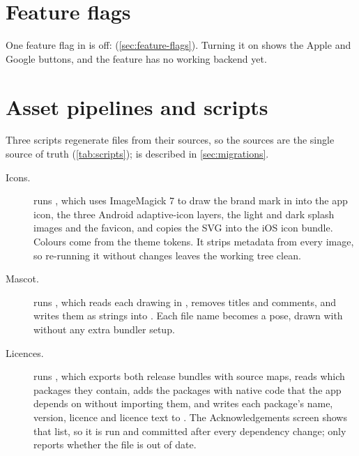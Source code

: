 \section{Feature flags}

One feature flag in  is off:  (\cref{sec:feature-flags}).
Turning it on shows the Apple and Google buttons, and the feature has no working backend yet.

\section{Asset pipelines and scripts}

Three scripts regenerate files from their sources, so the sources are the single source of truth
(\cref{tab:scripts});  is described in \cref{sec:migrations}.

\begin{description}
  \item[Icons.]  runs , which uses ImageMagick 7 to draw
    the brand mark in  into the app icon, the three Android adaptive-icon
    layers, the light and dark splash images and the favicon, and copies the SVG into the iOS icon bundle.
    Colours come from the theme tokens. It strips metadata from every image, so re-running it without
    changes leaves the working tree clean.
  \item[Mascot.]  runs , which reads each drawing in
    , removes titles and comments, and writes them as strings into
    . Each file name becomes a pose, drawn with
     without any extra bundler setup.
  \item[Licences.]  runs , which exports both release
    bundles with source maps, reads which packages they contain, adds the packages with native code that the
    app depends on without importing them, and writes each package's name, version, licence and licence
    text to . The Acknowledgements screen shows that list, so it
    is run and committed after every dependency change;  only reports whether the file is out
    of date.
\end{description}

